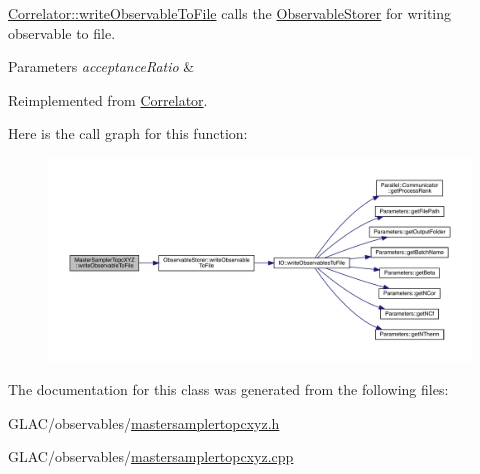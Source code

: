 \mbox{\hyperlink{class_correlator_a9e8d80e30e4fbe3b7fe57521538cb5ff}{Correlator\+::write\+Observable\+To\+File}} calls the \mbox{\hyperlink{class_observable_storer}{Observable\+Storer}} for writing observable to file. 


\begin{DoxyParams}{Parameters}
{\em acceptance\+Ratio} & \\
\hline
\end{DoxyParams}


Reimplemented from \mbox{\hyperlink{class_correlator_a9e8d80e30e4fbe3b7fe57521538cb5ff}{Correlator}}.

Here is the call graph for this function\+:\nopagebreak
\begin{figure}[H]
\begin{center}
\leavevmode
\includegraphics[width=350pt]{class_master_sampler_topc_x_y_z_a930f13a2a13f4b3820f40c8b52110cf2_cgraph}
\end{center}
\end{figure}


The documentation for this class was generated from the following files\+:\begin{DoxyCompactItemize}
\item 
G\+L\+A\+C/observables/\mbox{\hyperlink{mastersamplertopcxyz_8h}{mastersamplertopcxyz.\+h}}\item 
G\+L\+A\+C/observables/\mbox{\hyperlink{mastersamplertopcxyz_8cpp}{mastersamplertopcxyz.\+cpp}}\end{DoxyCompactItemize}
